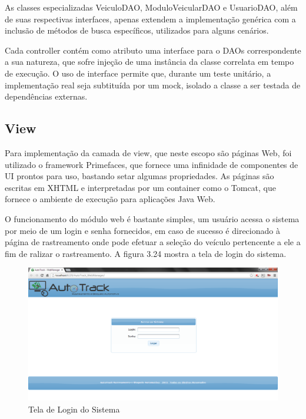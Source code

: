 As classes especializadas VeiculoDAO, ModuloVeicularDAO e UsuarioDAO, além de suas respectivas interfaces, apenas extendem a implementação genérica com a inclusão de métodos de busca específicos, utilizados para alguns cenários.

Cada controller contém como atributo uma interface para o DAOs correspondente a sua natureza, que sofre injeção de uma instância da classe correlata em tempo de execução. O uso de interface permite que, durante um teste unitário, a implementação real seja subtituída por um mock, isolado a classe a ser testada de dependências externas.

\subsection{View}

Para implementação da camada de view, que neste escopo são páginas Web, foi utilizado o framework Primefaces, que fornece uma infinidade de componentes de UI prontos para uso, bastando setar algumas propriedades. As páginas são escritas em XHTML e interpretadas por um container como o Tomcat, que fornece o ambiente de execução para aplicações Java Web.

O funcionamento do módulo web é bastante simples, um usuário acessa o sistema por meio de um login e senha fornecidos, em caso de sucesso é direcionado à página de rastreamento onde pode efetuar a seleção do veículo pertencente a ele a fim de ralizar o rastreamento. A figura 3.24 mostra a tela de login do sistema.

\begin{figure}[!htb]
	\centering
	\includegraphics[width=15.00cm\textwidth]{figures/webmanager_login.png}
	\caption{Tela de Login do Sistema}
	\label{Figura 14}
\end{figure}

